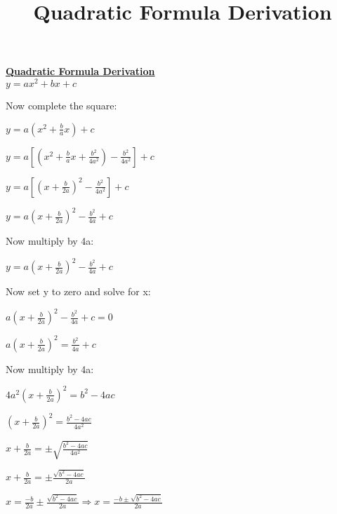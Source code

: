 \documentclass[26pt, letterpaper]{article}
\title{Quadratic Formula Derivation}
\begin{document}
\huge{
\textbf{\underline{Quadratic Formula Derivation}}\\


\bigskip
$y = ax^2  + bx + c$
\bigskip

Now complete the square:
\bigskip

$y = a \left(x^2 + \frac{b}{a}x \right) + c$
\bigskip

$y = a \left[ \left(x^2 + \frac{b}{a}x + \frac{b^2}{4a^2} \right ) - \frac{b^2}{4a^2} \right ] + c$
\bigskip

$y = a \left[ \left(x + \frac{b}{2a} \right)^2 - \frac{b^2}{4a^2} \right] + c$
\bigskip

$y = a \left(x + \frac{b}{2a} \right)^2 - \frac{b^2}{4a} + c$
\bigskip

Now multiply by 4a:
\bigskip
  
$y = a \left(x + \frac{b}{2a} \right)^2 - \frac{b^2}{4a} + c$
\bigskip

Now set y to zero and solve for x:
\bigskip

$a \left(x + \frac{b}{2a} \right)^2 - \frac{b^2}{4a} + c = 0$
\bigskip

$a \left(x + \frac{b}{2a} \right)^2 = \frac{b^2}{4a} + c$
\bigskip

Now multiply by 4a:
\bigskip

$4a^2 \left(x + \frac{b}{2a} \right)^2 = b^2 - 4ac$
\bigskip

$\left(x + \frac{b}{2a} \right)^2 = \frac{b^2 - 4ac}{4a^2}$
\bigskip

$x + \frac{b}{2a} = \pm \sqrt{\frac{b^2 - 4ac}{4a^2}}$
\bigskip

$x + \frac{b}{2a} = \pm \frac{\sqrt{b^2 - 4ac}}{2a}$
\bigskip

$x = \frac{-b}{2a} \pm \frac{\sqrt{b^2 - 4ac}}{2a} \Longrightarrow x = \frac{-b \pm \sqrt{b^2 - 4ac}}{2a}$  


}
\end{document}
